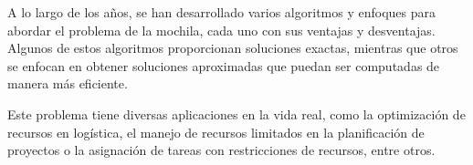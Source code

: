     A lo largo de los años, se han desarrollado varios algoritmos y enfoques para abordar el problema de la mochila, cada uno con sus ventajas y desventajas. Algunos de estos algoritmos proporcionan soluciones exactas, mientras que otros se enfocan en obtener soluciones aproximadas que puedan ser computadas de manera más eficiente.

    Este problema tiene diversas aplicaciones en la vida real, como la optimización de recursos en logística, el manejo de recursos limitados en la planificación de proyectos o la asignación de tareas con restricciones de recursos, entre otros.

\endinput